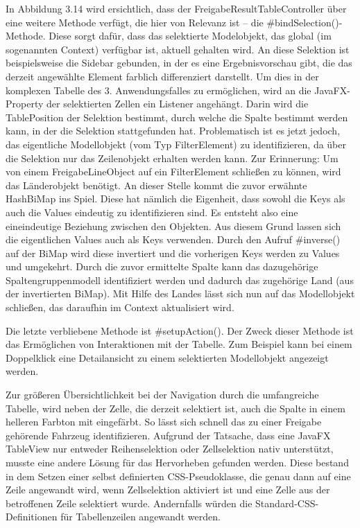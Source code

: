 In Abbildung 3.14 wird ersichtlich, dass der FreigabeResultTableController über eine weitere Methode verfügt, die hier von Relevanz ist – die \#bindSelection()-Methode. Diese sorgt dafür, dass das selektierte Modelobjekt, das global (im sogenannten Context) verfügbar ist, aktuell gehalten wird. An diese Selektion ist beispielsweise die Sidebar gebunden, in der es eine Ergebnisvorschau gibt, die das derzeit angewählte Element farblich differenziert darstellt. Um dies in der komplexen Tabelle des 3. Anwendungsfalles zu ermöglichen, wird an die JavaFX-Property der selektierten Zellen ein Listener angehängt. Darin wird die TablePosition der Selektion bestimmt, durch welche die Spalte bestimmt werden kann, in der die Selektion stattgefunden hat. Problematisch ist es jetzt jedoch, das eigentliche Modellobjekt (vom Typ FilterElement) zu identifizieren, da über die Selektion nur das Zeilenobjekt erhalten werden kann. Zur Erinnerung: Um von einem FreigabeLineObject auf ein FilterElement schließen zu können, wird das Länderobjekt benötigt. An dieser Stelle kommt die zuvor erwähnte HashBiMap ins Spiel. Diese hat nämlich die Eigenheit, dass sowohl die Keys als auch die Values eindeutig zu identifizieren sind. Es entsteht also eine eineindeutige Beziehung zwischen den Objekten. Aus diesem Grund lassen sich die eigentlichen Values auch als Keys verwenden. Durch den Aufruf \#inverse() auf der BiMap wird diese invertiert und die vorherigen Keys werden zu Values und umgekehrt. Durch die zuvor ermittelte Spalte kann das dazugehörige Spaltengruppenmodell identifiziert werden und dadurch das zugehörige Land (aus der invertierten BiMap). Mit Hilfe des Landes lässt sich nun auf das Modellobjekt schließen, das daraufhin im Context aktualisiert wird.

Die letzte verbliebene Methode ist \#setupAction(). Der Zweck dieser Methode ist das Ermöglichen von Interaktionen mit der Tabelle. Zum Beispiel kann bei einem Doppelklick eine Detailansicht zu einem selektierten Modellobjekt angezeigt werden.

Zur größeren Übersichtlichkeit bei der Navigation durch die umfangreiche Tabelle, wird neben der Zelle, die derzeit selektiert ist, auch die Spalte in einem helleren Farbton mit eingefärbt. So lässt sich schnell das zu einer Freigabe gehörende Fahrzeug identifizieren. Aufgrund der Tatsache, dass eine JavaFX TableView nur entweder Reihenselektion oder Zellselektion nativ unterstützt, musste eine andere Lösung für das Hervorheben gefunden werden. Diese bestand in dem Setzen einer selbst definierten CSS-Pseudoklasse, die genau dann auf eine Zeile angewandt wird, wenn Zellselektion aktiviert ist und eine Zelle aus der betroffenen Zeile selektiert wurde. Andernfalls würden die Standard-CSS-Definitionen für Tabellenzeilen angewandt werden.